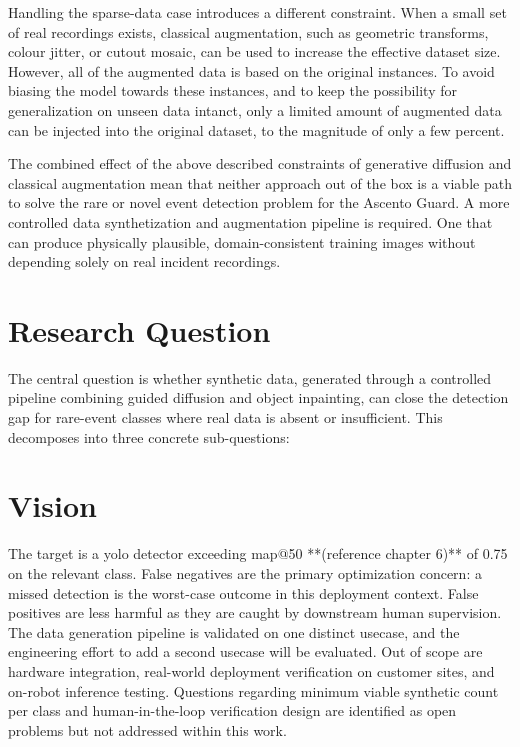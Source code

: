 Handling the sparse-data case introduces a different constraint. When a small set of real recordings exists, 
classical augmentation, such as geometric transforms, colour jitter, or cutout mosaic, can be used to increase the effective dataset size. 
However, all of the augmented data is based on the original instances. To avoid biasing the model towards these instances, 
and to keep the possibility for generalization on unseen data intanct, only a limited amount of augmented data can be injected 
into the original dataset, to the magnitude of only a few percent. 

The combined effect of the above described constraints of generative diffusion and classical augmentation mean that neither approach 
out of the box is a viable path to solve the rare or novel event detection problem for the Ascento Guard. 
A more controlled data synthetization and augmentation pipeline is required. One that can produce physically 
plausible, domain-consistent training images without depending solely on real incident recordings. 

\section{Research Question}
The central question is whether synthetic data, generated through a controlled pipeline combining guided diffusion and object inpainting, 
can close the detection gap for rare-event classes where real data is absent or insufficient. This decomposes into three concrete sub-questions:


\section{Vision}
The target is a \gls{yolo} detector exceeding \gls{map@50} **(reference chapter 6)** of 0.75 on the relevant class. 
False negatives are the primary optimization concern: a missed detection is the worst-case outcome in 
this deployment context. False positives are less harmful as they are caught by downstream human supervision. 
The data generation pipeline is validated on one distinct usecase, and the engineering effort to add a second usecase will be evaluated. 
Out of scope are hardware integration, real-world deployment verification on customer sites, and on-robot inference testing. 
Questions regarding minimum viable synthetic count per class and human-in-the-loop verification design are identified as open problems 
but not addressed within this work. 
